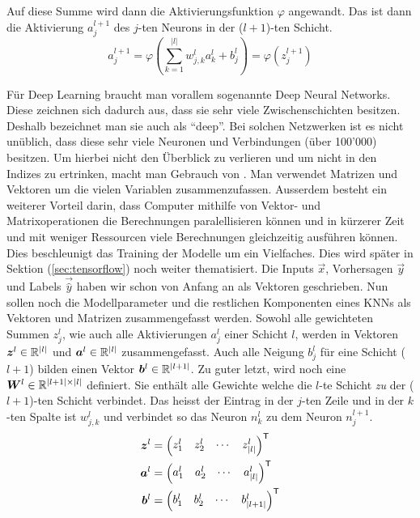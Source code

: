 Auf diese Summe wird dann die Aktivierungsfunktion $\varphi$ angewandt.
Das ist dann die Aktivierung $a_j^{l+1}$ des $j$-ten Neurons in der ($l+1$)-ten Schicht.
\\
\begin{equation}\tag{FP2}\label{eq:aktivierung_normal}
  a_j^{l+1} = \varphi\left(\sum_{k=1}^{|l|} w_{j,k}^l a_k^{l} + b_j^l \right) = \varphi \left( z_j^{l+1} \right)
\end{equation}
\par\bigskip
Für Deep Learning braucht man vorallem sogenannte Deep Neural Networks. Diese
zeichnen sich dadurch aus, dass sie sehr viele Zwischenschichten besitzen.
Deshalb bezeichnet man sie auch als ``deep''.
Bei solchen Netzwerken ist es nicht unüblich,
dass diese sehr viele Neuronen und Verbindungen (über 100'000) besitzen.
Um hierbei nicht den Überblick zu verlieren und um nicht in den Indizes zu
ertrinken, macht man Gebrauch von . Man verwendet
Matrizen und Vektoren um die vielen Variablen zusammenzufassen.
Ausserdem besteht ein weiterer Vorteil darin, dass Computer mithilfe von Vektor-
und Matrixoperationen die Berechnungen paralellisieren können und in kürzerer
Zeit und mit weniger Ressourcen viele Berechnungen gleichzeitig ausführen können.
Dies beschleunigt das Training der Modelle um
ein Vielfaches. Dies wird später in Sektion
(\ref{sec:tensorflow}) noch weiter thematisiert.
\para{}
Die Inputs $\vec{x}$, Vorhersagen $\vec{y}$ und Labels $\vec{\hat{y}}$ haben wir schon von Anfang an als Vektoren geschrieben.
Nun sollen noch die Modellparameter und die restlichen Komponenten eines KNNs als Vektoren und Matrizen zusammengefasst werden.
Sowohl alle gewichteten Summen $z_j^l$, wie auch alle Aktivierungen $a_j^l$
einer Schicht $l$, werden in Vektoren $\bm{z}^l \in \mathbb{R}^{|l|}$ und
$\bm{a}^l \in \mathbb{R}^{|l|}$ zusammengefasst.
Auch alle Neigung $b_j^l$ für eine Schicht ($l+1$) bilden einen Vektor
$\bm{b}^l \in \mathbb{R}^{|l+1|}$.
\para{}
Zu guter letzt, wird noch eine  $\bm{W}^l \in
\mathbb{R}^{|l+1| \times |l|}$
definiert. Sie enthält alle Gewichte welche die $l$-te
Schicht \textit{zu} der ($l+1$)-ten Schicht verbindet.
Das heisst der Eintrag in der $j$-ten Zeile und in
der $k$-ten Spalte ist $w_{j,k}^l$ und verbindet so das Neuron $n_k^{l}$ zu
dem Neuron $n_j^{l+1}$.
\\
\begin{align*}
  \bm{z}^l &=  \begin{pmatrix} z_1^l & z_2^l & \cdots & z_{|l|}^l \end{pmatrix}^{\mathsf{T}} \\
  \bm{a}^l &=  \begin{pmatrix} a_1^l & a_2^l & \cdots & a_{|l|}^l \end{pmatrix}^{\mathsf{T}} \\
  \bm{b}^l &=  \begin{pmatrix} b_1^l & b_2^l & \cdots & b_{|l+1|}^l \end{pmatrix}^{\mathsf{T}} \\
\end{align*}
